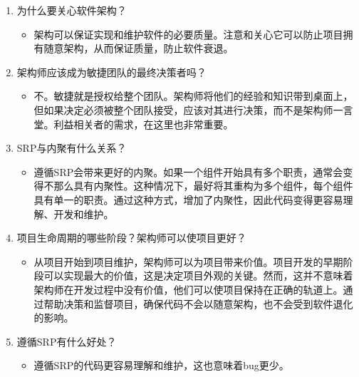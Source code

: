 

\begin{enumerate}
\item 
为什么要关心软件架构？

\begin{itemize}
\item 
架构可以保证实现和维护软件的必要质量。注意和关心它可以防止项目拥有随意架构，从而保证质量，防止软件衰退。
\end{itemize}

\item 
架构师应该成为敏捷团队的最终决策者吗？
\begin{itemize}
\item 
不。敏捷就是授权给整个团队。架构师将他们的经验和知识带到桌面上，但如果决定必须被整个团队接受，应该对其进行决策，而不是架构师一言堂。利益相关者的需求，在这里也非常重要。
\end{itemize}

\item 
SRP与内聚有什么关系？

\begin{itemize}
\item 
遵循SRP会带来更好的内聚。如果一个组件开始具有多个职责，通常会变得不那么具有内聚性。这种情况下，最好将其重构为多个组件，每个组件具有单一的职责。通过这种方式，增加了内聚性，因此代码变得更容易理解、开发和维护。
\end{itemize}

\item
项目生命周期的哪些阶段？架构师可以使项目更好？

\begin{itemize}
\item 
从项目开始到项目维护，架构师可以为项目带来价值。项目开发的早期阶段可以实现最大的价值，这是决定项目外观的关键。然而，这并不意味着架构师在开发过程中没有价值，他们可以使项目保持在正确的轨道上。通过帮助决策和监督项目，确保代码不会以随意架构，也不会受到软件退化的影响。
\end{itemize}

\item
遵循SRP有什么好处？

\begin{itemize}
\item 
遵循SRP的代码更容易理解和维护，这也意味着bug更少。
\end{itemize}

\end{enumerate}